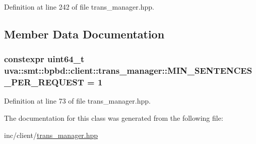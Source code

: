 Definition at line 242 of file trans\+\_\+manager.\+hpp.



\subsection{Member Data Documentation}
\hypertarget{classuva_1_1smt_1_1bpbd_1_1client_1_1trans__manager_a805717fdbf4e89f34206499160d8155b}{}
\subsubsection[{M\+I\+N\+\_\+\+S\+E\+N\+T\+E\+N\+C\+E\+S\+\_\+\+P\+E\+R\+\_\+\+R\+E\+Q\+U\+E\+S\+T}]{\setlength{\rightskip}{0pt plus 5cm}constexpr uint64\+\_\+t uva\+::smt\+::bpbd\+::client\+::trans\+\_\+manager\+::\+M\+I\+N\+\_\+\+S\+E\+N\+T\+E\+N\+C\+E\+S\+\_\+\+P\+E\+R\+\_\+\+R\+E\+Q\+U\+E\+S\+T = 1\hspace{0.3cm}{\ttfamily [static]}}\label{classuva_1_1smt_1_1bpbd_1_1client_1_1trans__manager_a805717fdbf4e89f34206499160d8155b}


Definition at line 73 of file trans\+\_\+manager.\+hpp.



The documentation for this class was generated from the following file\+:\begin{DoxyCompactItemize}
\item 
inc/client/\hyperlink{client_2trans__manager_8hpp}{trans\+\_\+manager.\+hpp}\end{DoxyCompactItemize}
